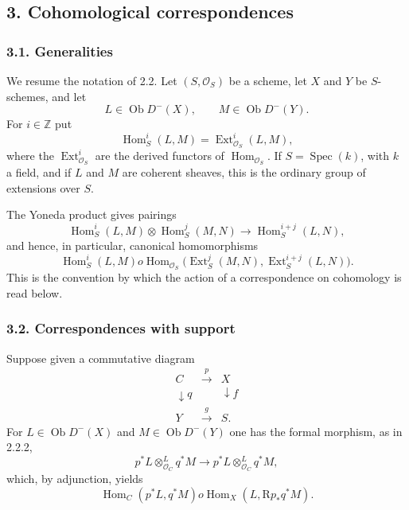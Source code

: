 \documentclass[12pt]{article}
\newcommand{\ZZ}{\mathbb Z}
\newcommand{\Spec}{\operatorname{Spec}}
\newcommand{\Hom}{\operatorname{Hom}}
\newcommand{\Ext}{\operatorname{Ext}}
\newcommand{\ob}{\operatorname{Ob}}
\newcommand{\R}{\mathrm R}
\newcommand{\cO}{\mathcal O}
\begin{document}
\subsection*{3. Cohomological correspondences}

\subsubsection*{3.1. Generalities}
We resume the notation of 2.2. Let $(S,\cO_S)$ be a scheme, let $X$ and $Y$ be $S$-schemes, and let
\[
   L\in\ob D^{-}(X), \qquad M\in\ob D^{-}(Y).
\]
For $i\in \ZZ$ put
\begin{equation}
   \Hom^i_S(L,M)=\Ext^i_{\cO_S}(L,M),
   \tag{3.1.1}
\end{equation}
where the $\Ext^i_{\cO_S}$ are the derived functors of $\Hom_{\cO_S}$. If $S=\Spec(k)$, with $k$ a field, and if $L$ and $M$ are coherent sheaves, this is the ordinary group of extensions over $S$.

The Yoneda product gives pairings
\begin{equation}
   \Hom^i_S(L,M)\otimes \Hom^j_S(M,N)
      \longrightarrow \Hom^{i+j}_S(L,N),
   \tag{3.1.2}
\end{equation}
and hence, in particular, canonical homomorphisms
\begin{equation}
   \Hom^i_S(L,M)	o
   \Hom_{\cO_S}\bigl(\Ext^j_S(M,N),\Ext^{i+j}_S(L,N)\bigr).
   \tag{3.1.3}
\end{equation}
This is the convention by which the action of a correspondence on cohomology is read below.

\subsubsection*{3.2. Correspondences with support}
Suppose given a commutative diagram
\[
\begin{array}{ccc}
C & \xrightarrow{p} & X \\
\downarrow q & & \downarrow f \\
Y & \xrightarrow{g} & S .
\end{array}
\]
For $L\in\ob D^{-}(X)$ and $M\in\ob D^{-}(Y)$ one has the formal morphism, as in 2.2.2,
\begin{equation}
   p^*L\otimes^L_{\cO_C}q^*M
      \longrightarrow p^*L\otimes^L_{\cO_C}q^*M,
   \tag{3.2.1}
\end{equation}
which, by adjunction, yields
\begin{equation}
   \Hom_C(p^*L,q^*M)	o \Hom_X(L,\R p_*q^*M).
   \tag{3.2.2}
\end{equation}
\end{document}
